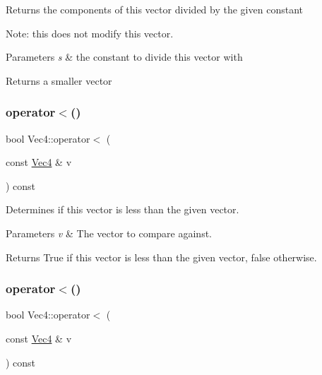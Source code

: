 Returns the components of this vector divided by the given constant

Note\+: this does not modify this vector.


\begin{DoxyParams}{Parameters}
{\em s} & the constant to divide this vector with \\
\hline
\end{DoxyParams}
\begin{DoxyReturn}{Returns}
a smaller vector 
\end{DoxyReturn}
\mbox{\label{classVec4_ac7ecf33888559cc10db167b2b64282e2}} 
\subsubsection{\texorpdfstring{operator$<$()}{operator<()}\hspace{0.1cm}{\footnotesize\ttfamily [1/2]}}
{\footnotesize\ttfamily bool Vec4\+::operator$<$ (\begin{DoxyParamCaption}\item[{const \hyperlink{classVec4}{Vec4} \&}]{v }\end{DoxyParamCaption}) const\hspace{0.3cm}{\ttfamily [inline]}}

Determines if this vector is less than the given vector.


\begin{DoxyParams}{Parameters}
{\em v} & The vector to compare against.\\
\hline
\end{DoxyParams}
\begin{DoxyReturn}{Returns}
True if this vector is less than the given vector, false otherwise. 
\end{DoxyReturn}
\mbox{\label{classVec4_ac7ecf33888559cc10db167b2b64282e2}} 
\subsubsection{\texorpdfstring{operator$<$()}{operator<()}\hspace{0.1cm}{\footnotesize\ttfamily [2/2]}}
{\footnotesize\ttfamily bool Vec4\+::operator$<$ (\begin{DoxyParamCaption}\item[{const \hyperlink{classVec4}{Vec4} \&}]{v }\end{DoxyParamCaption}) const\hspace{0.3cm}{\ttfamily [inline]}}

